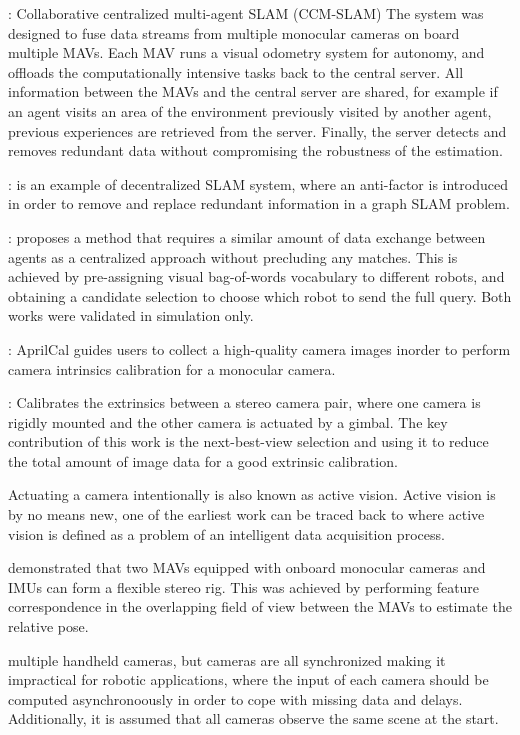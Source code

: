 \documentclass{article}
\begin{document}
: Collaborative centralized multi-agent SLAM
(CCM-SLAM) The system was designed to fuse data streams from multiple monocular
cameras on board multiple MAVs. Each MAV runs a visual odometry system for
autonomy, and offloads the computationally intensive tasks back to the central
server. All information between the MAVs and the central server are shared, for
example if an agent visits an area of the environment previously visited by
another agent, previous experiences are retrieved from the server. Finally, the
server detects and removes redundant data without compromising the robustness
of the estimation.

: is an example of decentralized SLAM system, where an
anti-factor is introduced in order to remove and replace redundant information
in a graph SLAM problem.

: proposes a method that requires a similar
amount of data exchange between agents as a centralized approach without
precluding any matches. This is achieved by pre-assigning visual bag-of-words
vocabulary to different robots, and obtaining a candidate selection to choose
which robot to send the full query.  Both works were validated in simulation
only.

: AprilCal guides users to collect a high-quality
camera images inorder to perform camera intrinsics calibration for a monocular
camera.

: Calibrates the extrinsics between a
stereo camera pair, where one camera is rigidly mounted and the other camera is
actuated by a gimbal. The key contribution of this work is the next-best-view
selection and using it to reduce the total amount of image data for a good
extrinsic calibration.

 Actuating a camera intentionally is also known as
active vision. Active vision is by no means new, one of the earliest work can
be traced back to \cite{Bajcsy1988} where active vision is defined as a
problem of an intelligent data acquisition process.

 demonstrated that two MAVs equipped with
onboard monocular cameras and IMUs can form a flexible stereo rig. This was
achieved by performing feature correspondence in the overlapping field of view
between the MAVs to estimate the relative pose.

 multiple handheld cameras, but cameras are all
synchronized making it impractical for robotic applications, where the input of
each camera should be computed asynchronoously in order to cope with missing
data and delays. Additionally, it is assumed that all cameras observe the same
scene at the start.
\end{document}
